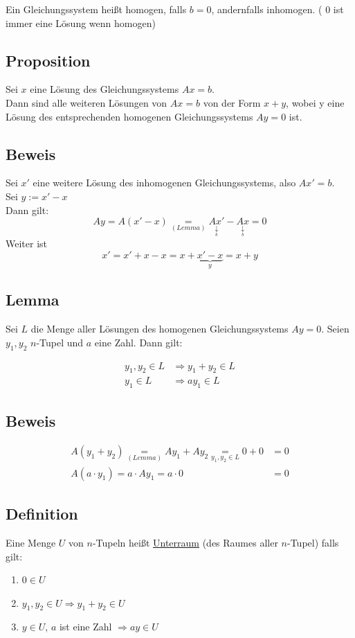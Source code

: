 Ein Gleichungssystem heißt homogen, falls \(b=0\), andernfalls inhomogen. ( \(0\) ist immer eine Lösung wenn homogen)

\subsection{Proposition}
Sei \(x\) eine Lösung des Gleichungssystems \(Ax=b\). \\
Dann sind alle weiteren Lösungen von \(Ax=b\) von der Form \(x+y\), wobei y eine Lösung des entsprechenden homogenen Gleichungssystems \(Ay=0\) ist.

\subsection{Beweis}
Sei \(x'\) eine weitere Lösung des inhomogenen Gleichungssystems, also \(Ax'=b\). \\
Sei \(y := x' - x\) \\
Dann gilt: 
\[
Ay= A(x'-x) \underset{(Lemma)}{=} \underset{ \underset{b}{\downarrow}}{Ax'} - \underset{ \underset{b}{\downarrow}}{Ax} = 0
\]
Weiter ist
\[
x'=x'+x-x=x+\underbrace{x'-x}_{y} = x+y
\]

\subsection{Lemma}
Sei \(L\) die Menge aller Lösungen des homogenen Gleichungssystems \(Ay=0\). Seien \(y_1,y_2\) \(n\)-Tupel und \(a\) eine Zahl. Dann gilt:
\renewcommand{\labelenumi}{(\roman{enumi})}

\begin{align}
y_1,y_2 \in L &\Longrightarrow y_1 + y_2 \in L \\
y_1 \in L &\Longrightarrow ay_1 \in L
\end{align}
\setcounter{equation}{0}
\subsection{Beweis}
\begin{align}
A(y_1 + y_2) \underset{(Lemma)}{=} Ay_1 + Ay_2 \underset{y_1, y_2 \in L}{=} 0+0 &= 0 \\
A(a \cdot y_1) = a \cdot Ay_1 = a \cdot 0 &= 0
\end{align}

\subsection{Definition}
Eine Menge \(U\) von \(n\)-Tupeln heißt \underline{Unterraum} (des Raumes aller \(n\)-Tupel) falls gilt:
\begin{enumerate}
\item \( 0 \in U \) 
\item \( y_1, y_2 \in U \Longrightarrow y_1 +y_2 \in U \)
\item \( y \in U\), \enspace \(a\) ist eine Zahl \( \Longrightarrow ay \in U \)
\end{enumerate}

